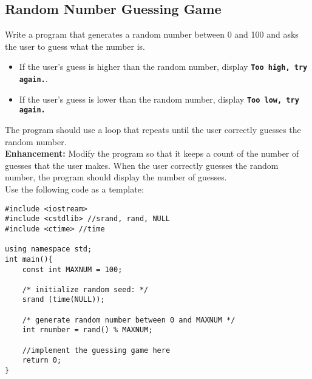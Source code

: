 \documentclass{article}
\begin{document}
\subsection{Random Number Guessing Game}
Write a program that generates a random number between 0 and 100 and asks the user to guess what the number is. 
\begin{itemize}
\item If the user's guess is higher than the random number, display \texttt{\textbf{Too high, try again.}}. 
\item If the user's guess is lower than the random number, display \texttt{\textbf{Too low, try again.}} 
\end{itemize}
The program should use a loop that repeats until the user correctly guesses the random number. \\
\textbf{Enhancement: }Modify the program so that it keeps a count of the number of guesses that the user makes. When the user correctly guesses the random number, the program should display the number of guesses.\\
Use the following code as a template:

\begin{verbatim}
#include <iostream>
#include <cstdlib> //srand, rand, NULL
#include <ctime> //time

using namespace std;
int main(){
	const int MAXNUM = 100;

	/* initialize random seed: */
	srand (time(NULL));

	/* generate random number between 0 and MAXNUM */
	int rnumber = rand() % MAXNUM;

	//implement the guessing game here
	return 0;
}
\end{verbatim}
\end{document}
